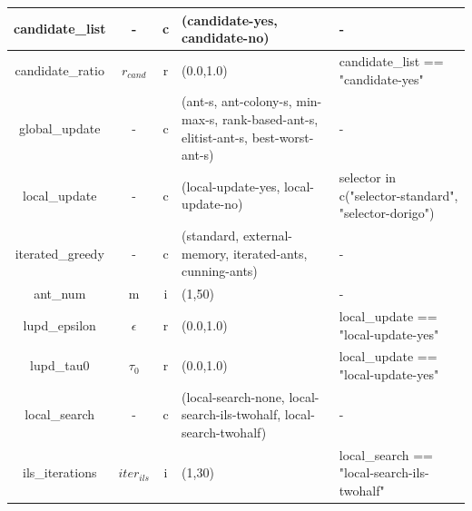 \documentclass[11pt,a4paper,oneside]{book}
\begin{document}
\begin{table}[]
\begin{tabular}{|c|c|c|p{4cm}|p{4cm}|}
candidate\_list                 & -          & c    & (candidate-yes, candidate-no)                                                   & -                                                                                             \\ \hline
candidate\_ratio                & $r_{cand}$ & r    & (0.0,1.0)                                                                      & candidate\_list == "candidate-yes"                                                            \\ \hline
global\_update                  & -          & c    & (ant-s, ant-colony-s, min-max-s, rank-based-ant-s, elitist-ant-s, best-worst-ant-s) & -                                                                                             \\ \hline
local\_update                   & -          & c    & (local-update-yes, local-update-no)                                             & selector in c("selector-standard", "selector-dorigo")                                          \\ \hline
iterated\_greedy                & -          & c    & (standard, external-memory, iterated-ants, cunning-ants)                          & -                                                                                             \\ \hline
ant\_num                        & m          & i    & (1,50)                                                                         & -                                                                                             \\ \hline
lupd\_epsilon                   & $\epsilon$ & r    & (0.0,1.0)                                                                      & local\_update == "local-update-yes"                                                           \\ \hline
lupd\_tau0                      & $\tau_0$   & r    & (0.0,1.0)                                                                      & local\_update == "local-update-yes"                                                           \\ \hline
local\_search                   & -          & c    & (local-search-none, local-search-ils-twohalf, local-search-twohalf)              & -                                                                                             \\ \hline
ils\_iterations                 & $iter_{ils}$ & i    & (1,30)                                                                         & local\_search == "local-search-ils-twohalf"                                                   \\ \hline

\end{tabular}
\end{table}
\end{document}
